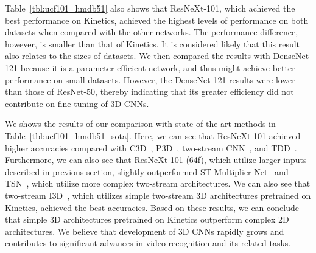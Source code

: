 \documentclass[10pt,twocolumn,letterpaper]{article}
\begin{document}
    Table~\ref{tbl:ucf101_hmdb51} also shows that ResNeXt-101, which achieved the best performance on Kinetics,
    achieved the highest levels of performance on both datasets when compared with the other networks.
    The performance difference, however, is smaller than that of Kinetics.
    It is considered likely that this result also relates to the sizes of datasets.
    We then compared the results with DenseNet-121
    because it is a parameter-efficient network,
    and thus might achieve better performance on small datasets.
    However, the DenseNet-121 results were lower than those of ResNet-50,
    thereby indicating that its greater efficiency did not contribute on fine-tuning of 3D CNNs.

    We shows the results of our comparison with state-of-the-art methods in Table~\ref{tbl:ucf101_hmdb51_sota}.
    Here, we can see that ResNeXt-101 achieved higher accuracies compared with
    C3D~\cite{C3D}, P3D~\cite{Qiu_2017_ICCV}, two-stream CNN~\cite{Simonyan2014}, and TDD~\cite{Wang2015TDD}.
    Furthermore, we can also see that ResNeXt-101 (64f), which utilize larger inputs described in previous section,
    slightly outperformed ST Multiplier Net~\cite{feichtenhofer2017multiplier} and TSN~\cite{Wang2016TSN},
    which utilize more complex two-stream architectures.
    We can also see that two-stream I3D~\cite{I3D_arxiv}, which utilizes simple two-stream 3D architectures pretrained on Kinetics,
    achieved the best accuracies.
    Based on these results, we can conclude that simple 3D architectures pretrained on Kinetics outperform complex 2D architectures.
    We believe that development of 3D CNNs rapidly grows and contributes to significant advances in video recognition and its related tasks.
\end{document}
